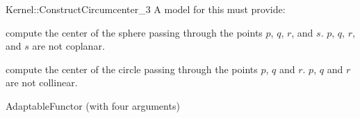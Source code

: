 \begin{ccRefFunctionObjectConcept}{Kernel::ConstructCircumcenter_3}
A model for this must provide:


 {compute the center of the sphere passing through the points $p$, $q$, $r$,
  and $s$.  \ccPrecond $p$, $q$, $r$, and $s$ are not coplanar.}

{compute the center of the circle passing through the points $p$, $q$ and $r$.
  \ccPrecond $p$, $q$ and $r$ are not collinear.}

\ccRefines
AdaptableFunctor (with four arguments)

\ccSeeAlso
{} \\

\end{ccRefFunctionObjectConcept}
